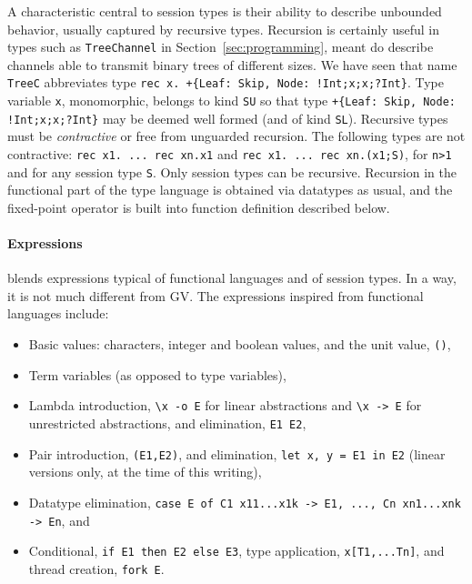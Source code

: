 A characteristic central to session types is their ability to describe
unbounded behavior, usually captured by recursive types. Recursion is
certainly useful in types such as \lstinline|TreeChannel| in
Section~\ref{sec:programming}, meant do describe channels able to
transmit binary trees of different sizes. We have seen that name
\lstinline|TreeC| abbreviates type
%
\lstinline|rec x. +{Leaf: Skip, Node: !Int;x;x;?Int}|.  Type variable
\lstinline|x|, monomorphic, belongs to kind \lstinline|SU| so that
type
%
\lstinline|+{Leaf: Skip, Node: !Int;x;x;?Int}| may be deemed well
formed (and of kind \lstinline|SL|).
%
Recursive types must be \emph{contractive} or free from unguarded
recursion. The following types are not contractive:
%
\lstinline|rec x1. ... rec xn.x1| and
%
\lstinline|rec x1. ... rec xn.(x1;S)|, for \lstinline|n>1| and for any
session type \lstinline|S|.
%
Only session types can be recursive. Recursion in the functional part
of the type language is obtained via datatypes as usual, and the
fixed-point operator is built into function definition described below.

\paragraph{Expressions}

\freest{} blends expressions typical of functional languages and of
session types. In a way, it is not much different from GV.
%
The expressions inspired from functional languages include:
%
\begin{itemize}
\item Basic values: characters, integer and boolean values, and the
  unit value, \lstinline|()|,
\item Term variables (as opposed to type variables),
\item Lambda introduction, \lstinline|\x -o E| for linear abstractions
  and \lstinline|\x -> E| for unrestricted abstractions, and
  elimination, \lstinline|E1 E2|,
\item Pair introduction, \lstinline|(E1,E2)|, and elimination,
  \lstinline|let x, y = E1 in E2| (linear versions only, at the time
  of this writing),
\item Datatype elimination,
  \lstinline|case E of C1 x11...x1k -> E1, ..., Cn xn1...xnk -> En|, and
\item Conditional, \lstinline|if E1 then E2 else E3|, type
  application, \lstinline|x[T1,...Tn]|, and thread creation,
  \lstinline|fork E|.
\end{itemize}

